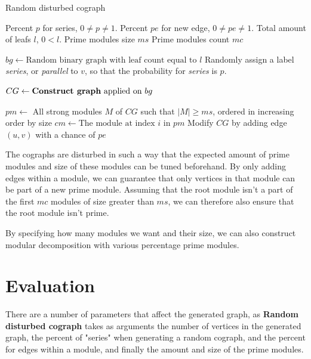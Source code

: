 \documentclass[a4paper]{article}
\begin{document}
\begin{algorithm}[H]
    \caption{Random disturbed cograph}
  \label{alg:RDCG}
  \begin{algorithmic}[1]
      \REQUIRE Percent $p$ for series, $0 \neq p \neq 1$.
      \REQUIRE Percent $pe$ for new  edge, $0 \neq pe \neq 1$.
      \REQUIRE Total amount of leafs $l$, $0 < l$.
      \REQUIRE Prime modules size $ms$
      \REQUIRE Prime modules count $mc$

      \STATE $bg \leftarrow \text{Random binary graph with leaf count equal to $l$}$
        \STATE Randomly assign a label  \textit{series}, or \textit{parallel} to $v$, so
        that the probability for \textit{series} is $p$.
      \ENDFOR

      \STATE $CG \leftarrow \text{\textbf{Construct graph} applied on $bg$}$

      \STATE $pm \leftarrow $ All strong modules $M$ of $CG$ such that $|M| \geq ms$, ordered in increasing order by size
        \STATE $cm \leftarrow \text{The module at index $i$ in $pm$}$
            \STATE Modify $CG$ by adding edge $(u,v)$ with a chance of $pe$
        \ENDFOR
      \ENDFOR
  \end{algorithmic}
\end{algorithm}

The cographs are disturbed in such a way that the expected amount of prime
modules and size of these modules can be tuned beforehand. By only adding edges
within a module, we can guarantee that only vertices in that module can be part
of a new prime module.  Assuming that the root module isn't a part of the first
$mc$ modules of size greater than $ms$, we can therefore also ensure that the
root module isn't prime.

By specifying how many modules we want and their size, we
can also construct modular decomposition with various percentage prime modules.

\section{Evaluation} 
\label{sec:Evaluation} 

There are a number of parameters that affect the generated graph, as
\textbf{Random disturbed cograph} takes as arguments the number of vertices in
the generated graph, the percent of "series" when generating a random cograph,
and the percent for edges within a module, and finally the amount and size of
the prime modules. 
\end{document}
